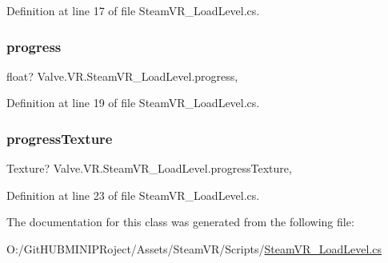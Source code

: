 Definition at line 17 of file Steam\+V\+R\+\_\+\+Load\+Level.\+cs.

\mbox{\label{class_valve_1_1_v_r_1_1_steam_v_r___load_level_a29e394161a441efd0b33e516871b475d}} 
\subsubsection{\texorpdfstring{progress}{progress}}
{\footnotesize\ttfamily float? Valve.\+V\+R.\+Steam\+V\+R\+\_\+\+Load\+Level.\+progress\hspace{0.3cm}{\ttfamily [static]}, {\ttfamily [get]}}



Definition at line 19 of file Steam\+V\+R\+\_\+\+Load\+Level.\+cs.

\mbox{\label{class_valve_1_1_v_r_1_1_steam_v_r___load_level_a48a694e49f94051b84dcc127df255397}} 
\subsubsection{\texorpdfstring{progressTexture}{progressTexture}}
{\footnotesize\ttfamily Texture? Valve.\+V\+R.\+Steam\+V\+R\+\_\+\+Load\+Level.\+progress\+Texture\hspace{0.3cm}{\ttfamily [static]}, {\ttfamily [get]}}



Definition at line 23 of file Steam\+V\+R\+\_\+\+Load\+Level.\+cs.



The documentation for this class was generated from the following file\+:\begin{DoxyCompactItemize}
\item 
O\+:/\+Git\+H\+U\+B\+M\+I\+N\+I\+P\+Roject/\+Assets/\+Steam\+V\+R/\+Scripts/\mbox{\hyperlink{_steam_v_r___load_level_8cs}{Steam\+V\+R\+\_\+\+Load\+Level.\+cs}}\end{DoxyCompactItemize}
